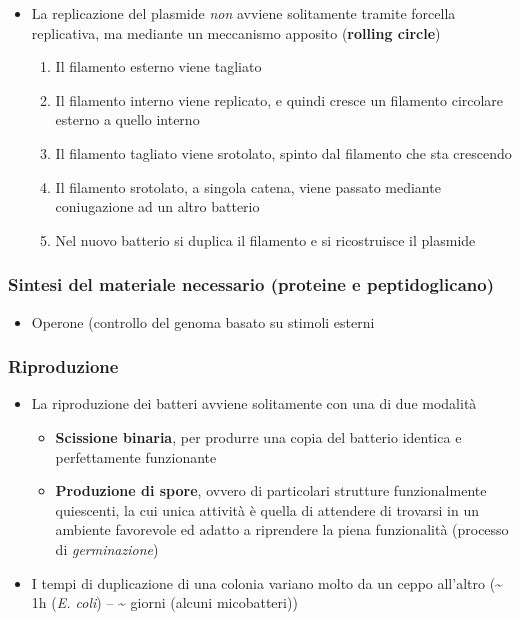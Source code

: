 \documentclass[italian,]{article}
\providecommand{\tightlist}{%
  \setlength{\itemsep}{0pt}\setlength{\parskip}{0pt}}
\newcommand{\asidefigure}[2]{\marginpar{\phantom{Img:}\newline\texttt{[image: \#1]}\\\footnotesize\emph{#2}}}
\begin{document}
\begin{itemize}
\tightlist
\item
  La replicazione del plasmide \emph{non} avviene solitamente tramite
  forcella replicativa, ma mediante un meccanismo apposito
  (\textbf{rolling circle})
  \asidefigure{img/replicazione-plasmide.png}{}

  \begin{enumerate}
  \def\labelenumi{\arabic{enumi}.}
  \tightlist
  \item
    Il filamento esterno viene tagliato
  \item
    Il filamento interno viene replicato, e quindi cresce un filamento
    circolare esterno a quello interno
  \item
    Il filamento tagliato viene srotolato, spinto dal filamento che sta
    crescendo
  \item
    Il filamento srotolato, a singola catena, viene passato mediante
    coniugazione ad un altro batterio
  \item
    Nel nuovo batterio si duplica il filamento e si ricostruisce il
    plasmide
  \end{enumerate}
\end{itemize}

\hypertarget{sintesi-del-materiale-necessario-proteine-e-peptidoglicano}{%
\subsubsection{Sintesi del materiale necessario (proteine e
peptidoglicano)}\label{sintesi-del-materiale-necessario-proteine-e-peptidoglicano}}

\begin{itemize}
\tightlist
\item
  Operone (controllo del genoma basato su stimoli esterni
\end{itemize}

\hypertarget{riproduzione}{%
\subsubsection{Riproduzione}\label{riproduzione}}

\begin{itemize}
\tightlist
\item
  La riproduzione dei batteri avviene solitamente con una di due
  modalità

  \begin{itemize}
  \tightlist
  \item
    \textbf{Scissione binaria}, per produrre una copia del batterio
    identica e perfettamente funzionante
  \item
    \textbf{Produzione di spore}, ovvero di particolari strutture
    funzionalmente quiescenti, la cui unica attività è quella di
    attendere di trovarsi in un ambiente favorevole ed adatto a
    riprendere la piena funzionalità (processo di \emph{germinazione})
  \end{itemize}
\item
  I tempi di duplicazione di una colonia variano molto da un ceppo
  all'altro (\textasciitilde{} 1h (\emph{E. coli}) -- \textasciitilde{}
  giorni (alcuni micobatteri))
\end{itemize}
\end{document}
